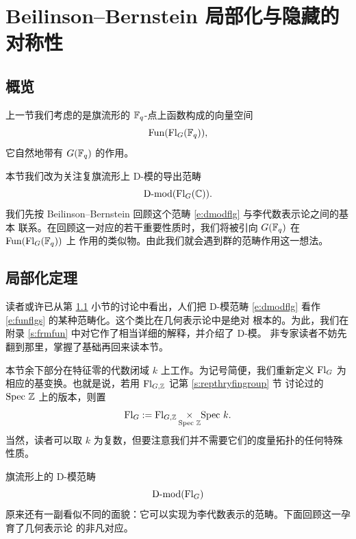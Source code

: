 
\section{Beilinson--Bernstein 局部化与隐藏的对称性}
\label{s:bbloc}

\subsection{概览}
\label{s:overview3}

\ssszh 上一节我们考虑的是旗流形的 $\mathbb{F}_q$-点上函数构成的向量空间
%
\begin{equation} \label{e:funflgs}
\operatorname{Fun}(\operatorname{Fl}_G(\mathbb{F}_q)),
\end{equation}
%
它自然地带有 $G(\mathbb{F}_q)$ 的作用。

本节我们改为关注复旗流形上 D-模的导出范畴
%
\begin{equation} \label{e:dmodflg}
\operatorname{D-mod}(\operatorname{Fl}_G(\mathbb{C})).
\end{equation}
%
我们先按 Beilinson--Bernstein 回顾这个范畴 \eqref{e:dmodflg} 与李代数表示论之间的基本
联系。在回顾这一对应的若干重要性质时，我们将被引向 $G(\mathbb{F}_q)$ 在 $\operatorname{Fun}(\operatorname{Fl}_G(\mathbb{F}_q))$ 上
作用的类似物。由此我们就会遇到群的范畴作用这一想法。

\subsection{局部化定理}

\ssszh 读者或许已从第 \ref{s:overview3} 小节的讨论中看出，人们把 D-模范畴
\eqref{e:dmodflg} 看作 \eqref{e:funflgs} 的某种范畴化。这个类比在几何表示论中是绝对
根本的。为此，我们在附录 \ref{s:frmfun} 中对它作了相当详细的解释，并介绍了 D-模。
非专家读者不妨先翻到那里，掌握了基础再回来读本节。

\ssszh 本节余下部分在特征零的代数闭域 $k$ 上工作。为记号简便，我们重新定义 $\operatorname{Fl}_G$ 为
相应的基变换。也就是说，若用 $\operatorname{Fl}_{G, \mathbb{Z}}$ 记第 \ref{s:repthryfingroup} 节
讨论过的 $\text{Spec } \mathbb{Z}$ 上的版本，则置
%
\[
 \operatorname{Fl}_G := \operatorname{Fl}_{G, \mathbb{Z}} \underset {\text{Spec } \mathbb{Z}} \times \text{Spec } k.
\]
%
当然，读者可以取 $k$ 为复数，但要注意我们并不需要它们的度量拓扑的任何特殊性质。

\ssszh 旗流形上的 D-模范畴
$$\operatorname{D-mod}(\operatorname{Fl}_G)$$
原来还有一副看似不同的面貌：它可以实现为李代数表示的范畴。下面回顾这一孕育了几何表示论
的非凡对应。

